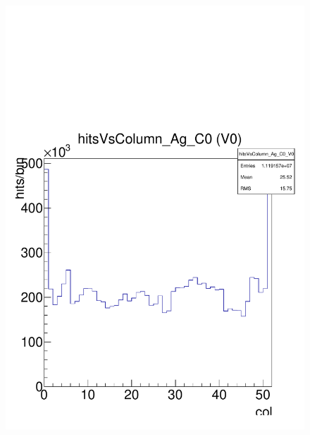 \documentclass[a4paper,12pt,twoside]{article}
\begin{document}
\begin{figure} [h!]
\centering
\begin{minipage}{.48\textwidth}
  \centering
  \includegraphics[width=\textwidth]{./HRData_HitsColumn.pdf}
  \label{HRData-HitsColumn}
\end{minipage}%
\hspace{2mm}
\begin{minipage}{.48\textwidth}
  \centering

\end{minipage}
\end{figure}
\end{document}
